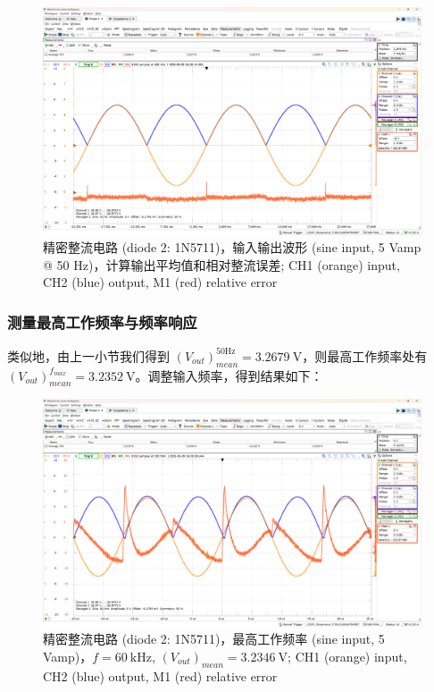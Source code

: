 \documentclass[UTF8]{article}
\begin{document}
\begin{figure}[H]\centering
    \includegraphics[width=\columnwidth]{LCE-05-精密整流/assets/1N5711/1N5711 input-output waveform (50 Hz) 1.png}
    \vspace*{-9mm}
    \caption{精密整流电路 (diode 2: 1N5711)，输入输出波形 (sine input, 5 Vamp @ 50 Hz)，计算输出平均值和相对整流误差; CH1 (orange) input, CH2 (blue) output, M1 (red) relative error}
\end{figure}


\subsubsection{测量最高工作频率与频率响应}

类似地，由上一小节我们得到 $(V_{out})_{mean}^{\mathrm{50 Hz}} = 3.2679 \ \mathrm{V}$，则最高工作频率处有 $(V_{out})_{mean}^{f_{max}} = 3.2352 \ \mathrm{V}$。调整输入频率，得到结果如下：

\begin{figure}[H]\centering
    \includegraphics[width=\columnwidth]{LCE-05-精密整流/assets/1N5711/1N5711 input-output waveform (max 70 kHz) with error and mean.png}
    \vspace*{-9mm}
    \caption{精密整流电路 (diode 2: 1N5711)，最高工作频率 (sine input, 5 Vamp)，$f = 60 \ \mathrm{kHz}$, $(V_{out})_{mean} = 3.2346 \ \mathrm{V}$; CH1 (orange) input, CH2 (blue) output, M1 (red) relative error}
\end{figure}
\end{document}
